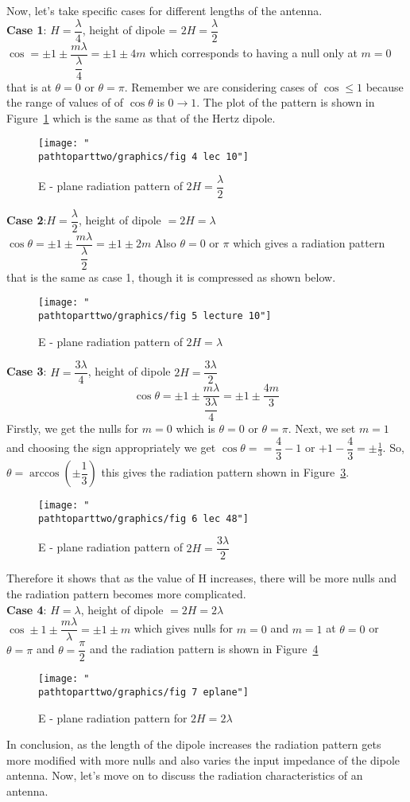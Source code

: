 Now, let's take specific cases for different lengths of the antenna.\\
\textbf{Case 1}: $H =\dfrac{\lambda}{4}$, height of dipole = $2H = \dfrac{\lambda}{2}$\\
$\cos = \pm1 \pm \dfrac{m\lambda}{\dfrac{\lambda}{4}} = \pm1 \pm 4m$ which corresponds to having a null only at $m = 0$ that is at $\theta = 0$ or $\theta = \pi$. Remember we are considering cases of $\cos\leq1$ because the range of values of of $\cos \theta$ is $0\rightarrow1$. The plot of the  pattern is shown in Figure~\ref{figure4} which is the same as that of the Hertz dipole.
\begin{figure}[h]
\centering
\texttt{[image: "\\pathtoparttwo/graphics/fig 4 lec 10"]}
\caption{E - plane radiation pattern of $2H = \dfrac{\lambda}{2}$}
\label{figure4}
\end{figure}

\textbf{Case 2}:$H = \dfrac{\lambda}{2}$, height of dipole $=2H =\lambda$\\
$\cos \theta = \pm 1 \pm \dfrac{m\lambda}{\dfrac{\lambda}{2}} = \pm 1 \pm 2m$
Also $\theta = 0$ or $\pi$ which gives a radiation pattern that is the same as case 1, though it is compressed as shown below. 
\begin{figure}[h]
\centering
\texttt{[image: "\\pathtoparttwo/graphics/fig 5 lecture 10"]}
\caption{E - plane radiation pattern of $2H = \lambda$}
\label{figure5}
\end{figure}

\textbf{Case 3}: $H = \dfrac{3\lambda}{4}$, height of dipole $2H = \dfrac{3\lambda}{2}$\\
$$\cos \theta = \pm1 \pm \dfrac{m\lambda}{\dfrac{3\lambda}{4}} = \pm 1\pm \dfrac{4m}{3}$$
Firstly, we get the nulls for $m=0$ which is $\theta = 0$ or $\theta = \pi$. Next, we set $m=1$ and choosing the sign appropriately we get $\cos \theta = =\dfrac{4}{3} - 1$ or $+1-\dfrac{4}{3}=\pm\frac{1}{3}$. So, $\theta = \arccos(\pm \dfrac{1}{3})$
this gives the radiation pattern shown in Figure~\ref{figure6}.
\begin{figure}[h]
\centering
\texttt{[image: "\\pathtoparttwo/graphics/fig 6 lec 48"]}
\caption{E - plane radiation pattern of $2H = \dfrac{3\lambda}{2}$}
\label{figure6}
\end{figure}

Therefore it shows that as the value of H increases, there will be more nulls and the radiation pattern becomes more complicated.\\
\textbf{Case 4}: $H = \lambda$, height of dipole $ =2H = 2\lambda$\\
$\cos \pm 1 \pm \dfrac{m\lambda}{\lambda} = \pm1 \pm m$ which gives nulls for $m = 0$ and $m= 1$ at $\theta =0$ or $\theta = \pi$ and $\theta = \dfrac{\pi}{2}$ and the radiation pattern is shown in Figure~\ref{figure7}
\begin{figure}[h]
\centering
\texttt{[image: "\\pathtoparttwo/graphics/fig 7 eplane"]}
\caption{E - plane radiation pattern for $2H = 2\lambda$}
\label{figure7}
\end{figure}

In conclusion, as the length of the dipole increases the radiation pattern gets more modified with more nulls and also varies the input impedance of the dipole antenna. Now, let's move on to discuss the radiation characteristics of an antenna.